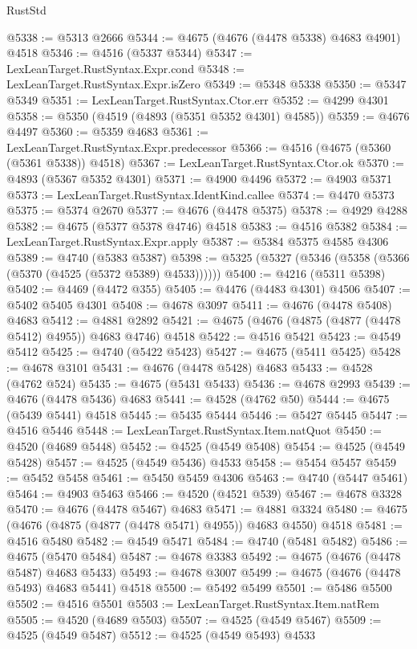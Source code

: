 \begin{lexlean}{RustStd}
\begin{coremodule}
{\begin{coremodule}
{{{{{{{{{{{{{{{{{{{{{{{{{{{{{{{{{{{{{{{{{{{{{{{{{{{{{{{{{{{{@5338 := @5313 @2666
@5344 := @4675 (@4676 (@4478 @5338) @4683 @4901) @4518
@5346 := @4516 (@5337 @5344)
@5347 := LexLeanTarget.RustSyntax.Expr.cond
@5348 := LexLeanTarget.RustSyntax.Expr.isZero
@5349 := @5348 @5338
@5350 := @5347 @5349
@5351 := LexLeanTarget.RustSyntax.Ctor.err
@5352 := @4299 @4301
@5358 := @5350 (@4519 (@4893 (@5351 @5352 @4301) @4585))
@5359 := @4676 @4497
@5360 := @5359 @4683
@5361 := LexLeanTarget.RustSyntax.Expr.predecessor
@5366 := @4516 (@4675 (@5360 (@5361 @5338)) @4518)
@5367 := LexLeanTarget.RustSyntax.Ctor.ok
@5370 := @4893 (@5367 @5352 @4301)
@5371 := @4900 @4496
@5372 := @4903 @5371
@5373 := LexLeanTarget.RustSyntax.IdentKind.callee
@5374 := @4470 @5373
@5375 := @5374 @2670
@5377 := @4676 (@4478 @5375)
@5378 := @4929 @4288
@5382 := @4675 (@5377 @5378 @4746) @4518
@5383 := @4516 @5382
@5384 := LexLeanTarget.RustSyntax.Expr.apply
@5387 := @5384 @5375 @4585 @4306
@5389 := @4740 (@5383 @5387)
@5398 := @5325 (@5327 (@5346 (@5358 (@5366 (@5370 (@4525 (@5372 @5389) @4533))))))
@5400 := @4216 (@5311 @5398)
@5402 := @4469 (@4472 @355)
@5405 := @4476 (@4483 @4301) @4506
@5407 := @5402 @5405 @4301
@5408 := @4678 @3097
@5411 := @4676 (@4478 @5408) @4683
@5412 := @4881 @2892
@5421 := @4675 (@4676 (@4875 (@4877 (@4478 @5412) @4955)) @4683 @4746) @4518
@5422 := @4516 @5421
@5423 := @4549 @5412
@5425 := @4740 (@5422 @5423)
@5427 := @4675 (@5411 @5425)
@5428 := @4678 @3101
@5431 := @4676 (@4478 @5428) @4683
@5433 := @4528 (@4762 @524)
@5435 := @4675 (@5431 @5433)
@5436 := @4678 @2993
@5439 := @4676 (@4478 @5436) @4683
@5441 := @4528 (@4762 @50)
@5444 := @4675 (@5439 @5441) @4518
@5445 := @5435 @5444
@5446 := @5427 @5445
@5447 := @4516 @5446
@5448 := LexLeanTarget.RustSyntax.Item.natQuot
@5450 := @4520 (@4689 @5448)
@5452 := @4525 (@4549 @5408)
@5454 := @4525 (@4549 @5428)
@5457 := @4525 (@4549 @5436) @4533
@5458 := @5454 @5457
@5459 := @5452 @5458
@5461 := @5450 @5459 @4306
@5463 := @4740 (@5447 @5461)
@5464 := @4903 @5463
@5466 := @4520 (@4521 @539)
@5467 := @4678 @3328
@5470 := @4676 (@4478 @5467) @4683
@5471 := @4881 @3324
@5480 := @4675 (@4676 (@4875 (@4877 (@4478 @5471) @4955)) @4683 @4550) @4518
@5481 := @4516 @5480
@5482 := @4549 @5471
@5484 := @4740 (@5481 @5482)
@5486 := @4675 (@5470 @5484)
@5487 := @4678 @3383
@5492 := @4675 (@4676 (@4478 @5487) @4683 @5433)
@5493 := @4678 @3007
@5499 := @4675 (@4676 (@4478 @5493) @4683 @5441) @4518
@5500 := @5492 @5499
@5501 := @5486 @5500
@5502 := @4516 @5501
@5503 := LexLeanTarget.RustSyntax.Item.natRem
@5505 := @4520 (@4689 @5503)
@5507 := @4525 (@4549 @5467)
@5509 := @4525 (@4549 @5487)
@5512 := @4525 (@4549 @5493) @4533
}}}}}}}}}}}}}}}}}}}}}}}}}}}}}}}}}}}}}}}}}}}}}}}}}}}}}}}}}}}}
\end{coremodule}}
\end{coremodule}
\end{lexlean}
